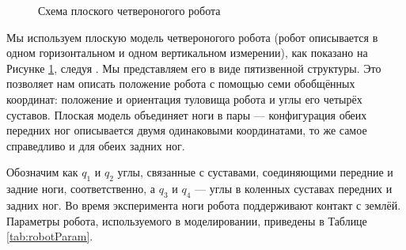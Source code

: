\begin{figure}[ht]
	\caption{Схема плоского четвероногого робота}\label{fig:robotSagital}
\end{figure} 
Мы используем плоскую модель четвероногого робота (робот описывается в одном горизонтальном и одном вертикальном измерении), как показано на Рисунке \ref{fig:robotSagital}, следуя \cite{RobotConfig}. Мы представляем его в виде пятизвенной структуры. Это позволяет нам описать положение робота с помощью семи обобщённых координат: положение и ориентация туловища робота и углы его четырёх суставов. Плоская модель объединяет ноги в пары --- конфигурация обеих передних ног описывается двумя одинаковыми координатами, то же самое справедливо и для обеих задних ног. 

Обозначим как $q_1$ и $q_2$ углы, связанные с суставами, соединяющими передние и задние ноги, соответственно, а $q_3$ и $q_4$ --- углы в коленных суставах передних и задних ног. Во время эксперимента ноги робота поддерживают контакт с землёй. Параметры робота, используемого в моделировании, приведены в Таблице \ref{tab:robotParam}.

